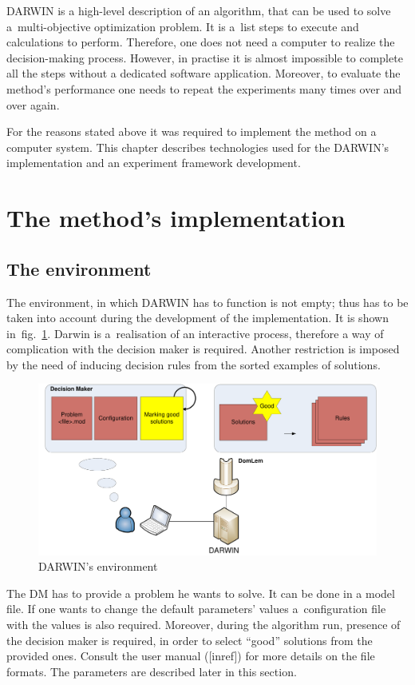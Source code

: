DARWIN is a high-level description of an algorithm, that can be used to solve
a~multi-objective optimization problem. It is a~list steps to execute and
calculations to perform. Therefore, one does not need a computer to realize
the decision-making process. However, in practise it is almost impossible to
complete all the steps without a dedicated software application. Moreover, to
evaluate the method's performance one needs to repeat the experiments many
times over and over again.

For the reasons stated above it was required to implement the method on a
computer system. This chapter describes technologies used for the DARWIN's
implementation and an experiment framework development.

\section{The method's implementation}

\subsection{The environment}

The environment, in which DARWIN has to function is not empty; thus has to be
taken into account during the development of the implementation. It is shown
in~fig.~\ref{environ}. Darwin is a~realisation of an interactive process,
therefore a way of complication with the decision maker is required. Another
restriction is imposed by the need of inducing decision rules from the sorted
examples of solutions.

\begin{figure}
  \centering \includegraphics[scale=0.5]{img/environ}
  \caption{DARWIN's environment}
  \label{environ}
\end{figure}

The DM has to provide a problem he wants to solve. It can be done in a model
file. If one wants to change the default parameters' values a~configuration
file with the values is also required. Moreover, during the algorithm run,
presence of the decision maker is required, in order to select ``good''
solutions from the provided ones. Consult the user manual ([inref]) for more
details on the file formats. The parameters are described later in this
section.

